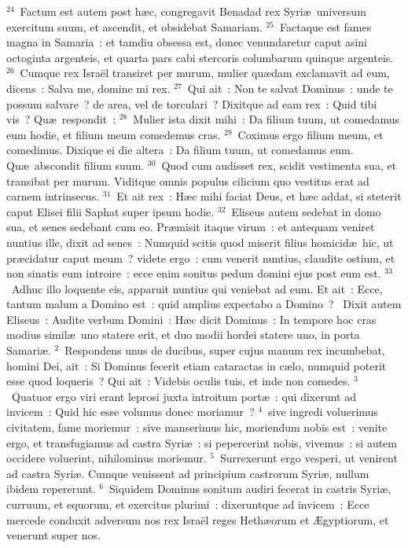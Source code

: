 ${}^{24}$~Factum est autem post h\ae c, congregavit Benadad rex Syri\ae\ universum exercitum suum, et ascendit, et obsidebat Samariam.
${}^{25}$~Factaque est fames magna in Samaria~: et tamdiu obsessa est, donec venundaretur caput asini octoginta argenteis, et quarta pars cabi stercoris columbarum quinque argenteis.
${}^{26}$~Cumque rex Isra\"el transiret per murum, mulier qu\ae dam exclamavit ad eum, dicens~: Salva me, domine mi rex.
${}^{27}$~Qui ait~: Non te salvat Dominus~: unde te possum salvare~? de area, vel de torculari~? Dixitque ad eam rex~: Quid tibi vis~? Qu\ae\ respondit~:
${}^{28}$~Mulier ista dixit mihi~: Da filium tuum, ut comedamus eum hodie, et filium meum comedemus cras.
${}^{29}$~Coximus ergo filium meum, et comedimus. Dixique ei die altera~: Da filium tuum, ut comedamus eum. Qu\ae\ abscondit filium suum.
${}^{30}$~Quod cum audisset rex, scidit vestimenta sua, et transibat per murum. Viditque omnis populus cilicium quo vestitus erat ad carnem intrinsecus.
${}^{31}$~Et ait rex~: H\ae c mihi faciat Deus, et h\ae c addat, si steterit caput Elisei filii Saphat super ipsum hodie.
${}^{32}$~Eliseus autem sedebat in domo sua, et senes sedebant cum eo. Pr\ae misit itaque virum~: et antequam veniret nuntius ille, dixit ad senes~: Numquid scitis quod miserit filius homicid\ae\ hic, ut pr\ae cidatur caput meum~? videte ergo~: cum venerit nuntius, claudite ostium, et non sinatis eum introire~: ecce enim sonitus pedum domini ejus post eum est.
${}^{33}$~Adhuc illo loquente eis, apparuit nuntius qui veniebat ad eum. Et ait~: Ecce, tantum malum a Domino est~: quid amplius expectabo a Domino~?
~Dixit autem Eliseus~: Audite verbum Domini~: H\ae c dicit Dominus~: In tempore hoc cras modius simil\ae\ uno statere erit, et duo modii hordei statere uno, in porta Samari\ae .
${}^{2}$~Respondens unus de ducibus, super cujus manum rex incumbebat, homini Dei, ait~: Si Dominus fecerit etiam cataractas in c\ae lo, numquid poterit esse quod loqueris~? Qui ait~: Videbis oculis tuis, et inde non comedes.
${}^{3}$~Quatuor ergo viri erant leprosi juxta introitum port\ae~: qui dixerunt ad invicem~: Quid hic esse volumus donec moriamur~?
${}^{4}$~sive ingredi voluerimus civitatem, fame moriemur~: sive manserimus hic, moriendum nobis est~: venite ergo, et transfugiamus ad castra Syri\ae~: si pepercerint nobis, vivemus~: si autem occidere voluerint, nihilominus moriemur.
${}^{5}$~Surrexerunt ergo vesperi, ut venirent ad castra Syri\ae . Cumque venissent ad principium castrorum Syri\ae , nullum ibidem repererunt.
${}^{6}$~Siquidem Dominus sonitum audiri fecerat in castris Syri\ae , curruum, et equorum, et exercitus plurimi~: dixeruntque ad invicem~: Ecce mercede conduxit adversum nos rex Isra\"el reges Heth\ae orum et \AE gyptiorum, et venerunt super nos.
